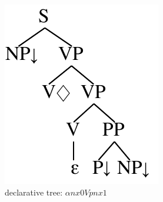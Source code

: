 \documentclass[11pt,a4paper]{article}
\begin{document}
\begin{figure}[h]
    \centering
    \begin{subfigure}{0.3\textwidth}
        \centering
        \includegraphics[width=1.0 \linewidth ]{resources/ch5_resources/metarule_declarative.pdf}
        \caption{declarative tree: $\alpha nx0Vpnx1$}
        \label{fig:metarule_declarative}
    \end{subfigure}
    \hfill
    \begin{subfigure}{0.38\textwidth}
        \centering

\end{subfigure}
\end{figure}
\end{document}

